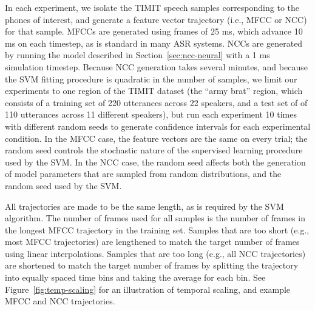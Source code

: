 In each experiment,
we isolate the TIMIT speech samples
corresponding to the phones
of interest,
and generate a feature vector trajectory
(i.e., MFCC or NCC)
for that sample.
MFCCs are generated using frames
of 25 ms,
which advance 10 ms on each timestep,
as is standard in many ASR systems.
NCCs are generated
by running the model described in
Section~\ref{sec:ncc-neural} with a 1 ms simulation timestep.
Because NCC generation takes several minutes,
and because the SVM fitting procedure
is quadratic in the number of samples,
we limit our experiments to
one region of the TIMIT dataset
(the ``army brat'' region,
which consists of a training set
of 220 utterances across 22 speakers,
and a test set of of 110 utterances
across 11 different speakers),
but run each experiment
10 times with different random seeds
to generate confidence intervals
for each experimental condition.
In the MFCC case,
the feature vectors are the same
on every trial;
the random seed controls the
stochastic nature of
the supervised learning procedure
used by the SVM.
In the NCC case,
the random seed affects both
the generation of model parameters
that are sampled from random distributions,
and the random seed used by the SVM.

All trajectories are
made to be the same length,
as is required by the SVM algorithm.
The number of frames used
for all samples is
the number of frames in
the longest MFCC trajectory
in the training set.
Samples that are too short
(e.g., most MFCC trajectories)
are lengthened to match the
target number of frames
using linear interpolations.
Samples that are too long
(e.g., all NCC trajectories)
are shortened to match the
target number of frames
by splitting the trajectory
into equally spaced time bins
and taking the average
for each bin.
See Figure~\ref{fig:temp-scaling} for
an illustration of temporal scaling,
and example MFCC and NCC trajectories.


